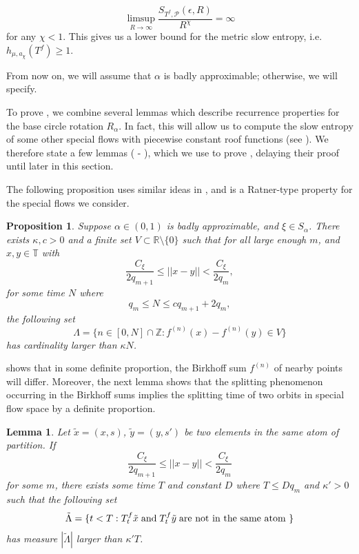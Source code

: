 \documentclass[oneside]{amsart}
\theoremstyle{plain}
\newtheorem{PROP}[THM]{Proposition}
\newtheorem{LEM}[THM]{Lemma}
\theoremstyle{definition}
\newcommand{\<}{\langle}
\renewcommand{\>}{\rangle}
\renewcommand{\P}{\mathcal{P}}
\newcommand{\e}{\epsilon}
\renewcommand{\|}{|\!|} %
\begin{document}
$$\displaystyle\limsup_{R\rightarrow \infty} \frac{S_{T^{f},\P}(\e,R)}{R^{\chi}}=\infty$$ for any $\chi<1$. This gives us a lower bound for the metric slow entropy, i.e. $h_{\mu,a_\chi}(T^f) \geq 1.$
 
From now on, we will assume that $\alpha$ is badly approximable; otherwise, we will specify.


To prove , we combine several lemmas which describe recurrence properties for the base circle rotation $R_\alpha$. In fact, this will allow us to compute the slow entropy of some other special flows with piecewise constant roof functions (see ). We therefore state a few lemmas ( - ), which we use to prove , delaying their proof until later in this section. 

The following proposition uses similar ideas in \cite[Lemma 4]{fraczek2007mild}, and is a Ratner-type property for the special flows we consider.
\begin{PROP}
\label{Prop Ratner}
Suppose \(\alpha\in (0,1)\) is badly approximable, and \(\xi\in S_{\alpha}\). There exists $\kappa,c>0$ and a finite set $V\subset {\mathbb{R}\setminus\{0\}}$ such that for all large enough $m$, and $ x,y \in \mathbb{T}$ with 
$$\frac{C_{\xi}}{2q_{m+1}}\leq \|x-y\|<\frac{C_{\xi}}{2q_m},$$ for some time $N$ where $$ q_m \leq N \leq cq_{m+1}+2q_m,$$  the following set $$\Lambda=\{n\in [0,N]\cap \mathbb{Z}:  f^{(n)}(x)-f^{(n)}(y)\in V\}$$ has cardinality larger than $\kappa N$.   
\end{PROP}


 
  shows that in some definite proportion, the Birkhoff sum $f^{(n)}$ of nearby points will differ. Moreover, the next lemma shows that the splitting phenomenon occurring in the Birkhoff sums implies the splitting time of two orbits in special flow space by a definite proportion. 
\begin{LEM}
\label{Divergence in flow}
Let $\tilde{x}=(x,s)$, $\tilde{y}=(y,s')$ be two elements in the same atom of partition. If $$\frac{C_{\xi}}{2q_{m+1}} \leq\|x-y\|<\frac{C_{\xi}}{2q_{m}}$$ for some $m$, there exists some time $T$ and constant \(D\) where
\(T \leq Dq_m\) and $\kappa'>0$ such that the following set
$$\tilde{\Lambda}=\{t<T: T_t^f{\tilde{x}} \text{\;and\;} T_t^f{\tilde{y}} \text{\;are not in the same atom }\}$$ has measure $|\tilde{\Lambda}|$ larger than $\kappa' T$.
\end{LEM}
\end{document}
